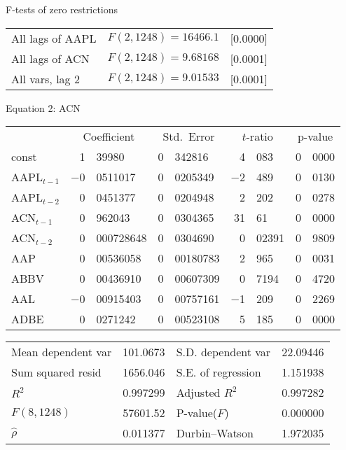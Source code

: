 \documentclass[11pt]{article}
\begin{document}
\begin{center}
F-tests of zero restrictions\\[1em]
\begin{tabular}{lll}
All lags of AAPL & $F(2, 1248) = 16466.1$ & [0.0000]\\
All lags of ACN & $F(2, 1248) = 9.68168$ & [0.0001]\\
All vars, lag 2 & $F(2, 1248) = 9.01533$ & [0.0001]\\
\end{tabular}
\end{center}

\clearpage

\begin{center}

Equation 2: ACN\\

\vspace{1em}

\begin{tabular}{lr@{.}lr@{.}lr@{.}lr@{.}l}
  &
 \multicolumn{2}{c}{Coefficient} &
  \multicolumn{2}{c}{Std.\ Error} &
   \multicolumn{2}{c}{$t$-ratio} &
    \multicolumn{2}{c}{p-value} \\[1ex]
const &
  1&39980 &
    0&342816 &
      4&083 &
        0&0000 \\
AAPL$_{t-1}$ &
  $-$0&0511017 &
    0&0205349 &
      $-$2&489 &
        0&0130 \\
AAPL$_{t-2}$ &
  0&0451377 &
    0&0204948 &
      2&202 &
        0&0278 \\
ACN$_{t-1}$ &
  0&962043 &
    0&0304365 &
      31&61 &
        0&0000 \\
ACN$_{t-2}$ &
  0&000728648 &
    0&0304690 &
      0&02391 &
        0&9809 \\
AAP &
  0&00536058 &
    0&00180783 &
      2&965 &
        0&0031 \\
ABBV &
  0&00436910 &
    0&00607309 &
      0&7194 &
        0&4720 \\
AAL &
  $-$0&00915403 &
    0&00757161 &
      $-$1&209 &
        0&2269 \\
ADBE &
  0&0271242 &
    0&00523108 &
      5&185 &
        0&0000 \\
\end{tabular}

\vspace{1ex}
\begin{tabular}{lrlr}
Mean dependent var &  101.0673 & S.D. dependent var &  22.09446 \\
Sum squared resid &  1656.046 & S.E. of regression &  1.151938 \\
$R^2$ &  0.997299 & Adjusted $R^2$ &  0.997282 \\
$F(8, 1248)$ &  57601.52 & P-value($F$) &  0.000000 \\
$\hat{\rho}$ &  0.011377 & Durbin--Watson &  1.972035 \\
\end{tabular}


\end{center}
\end{document}
